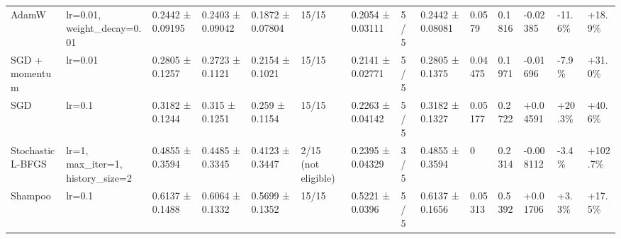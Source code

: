 \begin{tabular}{llllllllllllll}
AdamW & lr=0.01, weight\_decay=0.01 & 0.2442 ± 0.09195 & 0.2403 ± 0.09042 & 0.1872 ± 0.07804 & 15/15 & 0.2054 ± 0.03111 & 5/5 & 0.2442 ± 0.08081 & 0.0579 & 0.1816 & -0.02385 & -11.6\% & +18.9\% \\
SGD + momentum & lr=0.01 & 0.2805 ± 0.1257 & 0.2723 ± 0.1121 & 0.2154 ± 0.1021 & 15/15 & 0.2141 ± 0.02771 & 5/5 & 0.2805 ± 0.1375 & 0.04475 & 0.1971 & -0.01696 & -7.9\% & +31.0\% \\
SGD & lr=0.1 & 0.3182 ± 0.1244 & 0.315 ± 0.1251 & 0.259 ± 0.1154 & 15/15 & 0.2263 ± 0.04142 & 5/5 & 0.3182 ± 0.1327 & 0.05177 & 0.2722 & +0.04591 & +20.3\% & +40.6\% \\
Stochastic L-BFGS & lr=1, max\_iter=1, history\_size=2 & 0.4855 ± 0.3594 & 0.4485 ± 0.3345 & 0.4123 ± 0.3447 & 2/15 (not eligible) & 0.2395 ± 0.04329 & 3/5 & 0.4855 ± 0.3594 & 0 & 0.2314 & -0.008112 & -3.4\% & +102.7\% \\
Shampoo & lr=0.1 & 0.6137 ± 0.1488 & 0.6064 ± 0.1332 & 0.5699 ± 0.1352 & 15/15 & 0.5221 ± 0.0396 & 5/5 & 0.6137 ± 0.1656 & 0.05313 & 0.5392 & +0.01706 & +3.3\% & +17.5\% \\
\bottomrule
\end{tabular}
